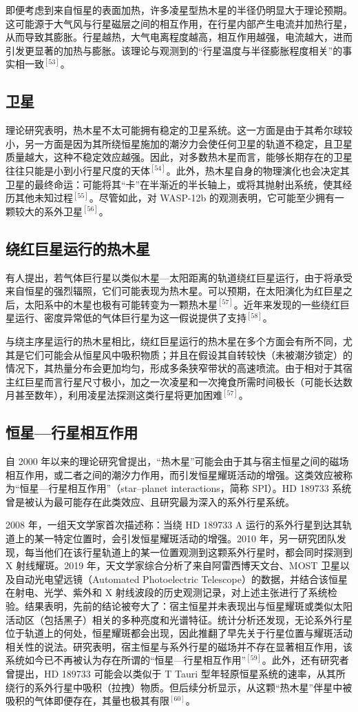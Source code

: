 即便考虑到来自恒星的表面加热，许多凌星型热木星的半径仍明显大于理论预期。这可能源于大气风与行星磁层之间的相互作用，在行星内部产生电流并加热行星，从而导致其膨胀。行星越热，大气电离程度越高，相互作用越强，电流越大，进而引发更显著的加热与膨胀。该理论与观测到的“行星温度与半径膨胀程度相关”的事实相一致$^{[53]}$。
\subsection{卫星}
理论研究表明，热木星不太可能拥有稳定的卫星系统。这一方面是由于其希尔球较小，另一方面是因为其所绕恒星施加的潮汐力会使任何卫星的轨道不稳定，且卫星质量越大，这种不稳定效应越强。因此，对多数热木星而言，能够长期存在的卫星往往只能是小到小行星尺度的天体$^{[54]}$。此外，热木星自身的物理演化也会决定其卫星的最终命运：可能将其“卡”在半渐近的半长轴上，或将其抛射出系统，使其经历其他未知过程$^{[55]}$。尽管如此，对 WASP-12b 的观测表明，它可能至少拥有一颗较大的系外卫星$^{[56]}$。
\subsection{绕红巨星运行的热木星}
有人提出，若气体巨行星以类似木星—太阳距离的轨道绕红巨星运行，由于将承受来自恒星的强烈辐照，它们可能表现为热木星。可以预期，在太阳演化为红巨星之后，太阳系中的木星也极有可能转变为一颗热木星$^{[57]}$。近年来发现的一些绕红巨星运行、密度异常低的气体巨行星为这一假说提供了支持$^{[58]}$。

与绕主序星运行的热木星相比，绕红巨星运行的热木星在多个方面会有所不同，尤其是它们可能会从恒星风中吸积物质；并且在假设其自转较快（未被潮汐锁定）的情况下，其热量分布会更加均匀，形成多条狭窄带状的高速喷流。由于相对于其宿主红巨星而言行星尺寸极小，加之一次凌星和一次掩食所需时间极长（可能长达数月甚至数年），利用凌星法探测这类行星将更加困难$^{[57]}$。
\subsection{恒星—行星相互作用}
自 2000 年以来的理论研究曾提出，“热木星”可能会由于其与宿主恒星之间的磁场相互作用，或二者之间的潮汐力作用，而引发恒星耀斑活动的增强。这类效应被称为“恒星—行星相互作用”（star–planet interactions，简称 SPI）。HD 189733 系统曾是被认为最可能存在此类效应、且研究最为深入的系外行星系统。

2008 年，一组天文学家首次描述称：当绕 HD 189733 A 运行的系外行星到达其轨道上的某一特定位置时，会引发恒星耀斑活动的增强。2010 年，另一研究团队发现，每当他们在该行星轨道上的某一位置观测到这颗系外行星时，都会同时探测到 X 射线耀斑。2019 年，天文学家综合分析了来自阿雷西博天文台、MOST 卫星以及自动光电望远镜（Automated Photoelectric Telescope）的数据，并结合该恒星在射电、光学、紫外和 X 射线波段的历史观测记录，对上述主张进行了系统检验。结果表明，先前的结论被夸大了：宿主恒星并未表现出与恒星耀斑或类似太阳活动区（包括黑子）相关的多种亮度和光谱特征。统计分析还发现，无论系外行星位于轨道上的何处，恒星耀斑都会出现，因此推翻了早先关于行星位置与耀斑活动相关性的说法。研究表明，宿主恒星与系外行星的磁场并不存在显著相互作用，该系统如今已不再被认为存在所谓的“恒星—行星相互作用”$^{[59]}$。此外，还有研究者曾提出，HD 189733 可能会以类似于 T Tauri 型年轻原恒星系统的速率，从其所绕行的系外行星中吸积（拉拽）物质。但后续分析显示，从这颗“热木星”伴星中被吸积的气体即便存在，其量也极其有限$^{[60]}$。
